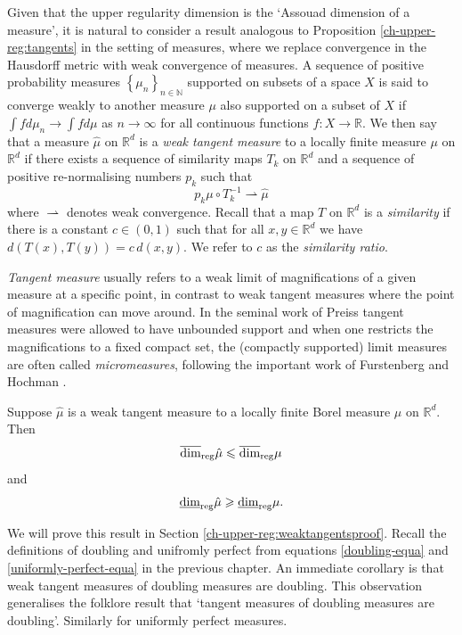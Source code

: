 Given that the upper regularity dimension is the `Assouad dimension of a measure', it is natural to consider a result analogous to Proposition \ref{ch-upper-reg:tangents} in the setting of measures, where we replace convergence in the Hausdorff metric with weak convergence of measures. A sequence of positive probability measures $\left\{\mu_n\right\}_{n\in \mathbb{N}}$ supported on subsets of a space $X$ is said to converge weakly to another measure $\mu$ also supported on a subset of $X$ if $\int fd \mu_n \rightarrow \int fd \mu$ as $n\rightarrow \infty$ for all continuous functions $f\colon X \rightarrow \mathbb{R}$. We then say that a measure  $\hat{\mu}$ on $ \mathbb{R}^d$ is a \emph{weak tangent measure} to a locally finite measure $\mu$ on $\mathbb{R}^d$ if there exists a sequence of similarity maps $T_k$ on  $\mathbb{R}^d$ and a sequence of positive re-normalising numbers $p_k$ such that
\[
p_k \mu \circ T^{-1}_k  \rightharpoonup \hat{\mu}
\]
where $\rightharpoonup$ denotes weak convergence. Recall that a map $T$ on $\mathbb{R}^d$ is a \emph{similarity} if there is a constant $c  \in \left(0,1 \right)$ such that  for all $x,y \in \mathbb{R}^d$ we have $d(T(x) , T(y) ) = c \, d(x, y )$.  We refer to $c$ as the \emph{similarity ratio}. 

\emph{Tangent measure} usually refers to a weak limit of magnifications of a given measure at a specific point, in contrast to weak tangent measures where the point of magnification can move around. In the seminal work of Preiss \cite{preiss} tangent measures were allowed to have unbounded support and when one restricts the magnifications to a fixed compact set, the (compactly supported) limit measures are often called \emph{micromeasures}, following the important work of Furstenberg \cite{furstenberg} and Hochman \cite{hochman}.  

\newpage
\begin{theorem}\label{ch-upper-reg:weaktangents}
	Suppose $\hat{\mu}$ is a weak tangent measure to a locally finite Borel measure  $\mu$ on $\mathbb{R}^d$.  Then 
	\[\overline{\dim}_{\textup{reg}} \hat{\mu} \leqslant \overline{\dim}_{\textup{reg}} \mu \]
	and
	\[\underline{\dim}_{\textup{reg}} \hat{\mu} \geqslant \underline{\dim}_{\textup{reg}} \mu.	\]
\end{theorem}

We will prove this result in Section \ref{ch-upper-reg:weaktangentsproof}.  Recall the definitions of doubling and unifromly perfect from equations \eqref{doubling-equa} and \eqref{uniformly-perfect-equa} in the previous chapter. An immediate corollary  is that weak tangent measures of doubling measures are doubling.  This observation generalises the folklore result that `tangent measures of doubling measures are doubling'. Similarly for uniformly perfect measures. 

